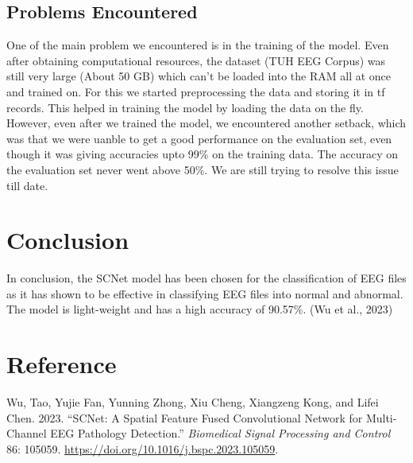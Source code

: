 \documentclass[10pt]{article}
\newlength{\cslhangindent}
\newlength{\cslentryspacingunit} %
\newenvironment{CSLReferences}[2] %
{%
    \setlength{\parindent}{0pt}
    \ifodd #1
        \let\oldpar\par
        \def\par{\hangindent=\cslhangindent\oldpar}
    \fi
    \setlength{\parskip}{#2\cslentryspacingunit}
}%
{}
\begin{document}
\subsection{Problems Encountered}
One of the main problem we encountered is in the training of the model. Even after obtaining computational resources, the dataset (TUH EEG Corpus) was still very large (About 50 GB) which can't be loaded into the RAM all at once and trained on. For this we started preprocessing the data and storing it in tf records. This helped in training the model by loading the data on the fly.
However, even after we trained the model, we encountered another setback, which was that we were uanble to get a good performance on the evaluation set, even though it was giving accuracies upto 99\% on the training data. The accuracy on the evaluation set never went above 50\%. We are still trying to resolve this issue till date.


\section{Conclusion}
In conclusion, the SCNet model has been chosen for the classification of EEG files as it has shown to be effective in classifying EEG files into normal and abnormal. The model is light-weight and has a high accuracy of 90.57\%. (Wu et al., 2023)

\section{Reference}
\hypertarget{refs}{}
\begin{CSLReferences}{1}{0}
    \leavevmode{}%
    Wu, Tao, Yujie Fan, Yunning Zhong, Xiu Cheng, Xiangzeng Kong, and Lifei
    Chen. 2023. {``SCNet: A Spatial Feature Fused Convolutional Network for
    Multi-Channel EEG Pathology Detection.''} \emph{Biomedical Signal
    Processing and Control} 86: 105059.
    \url{https://doi.org/10.1016/j.bspc.2023.105059}.

\end{CSLReferences}
\end{document}
